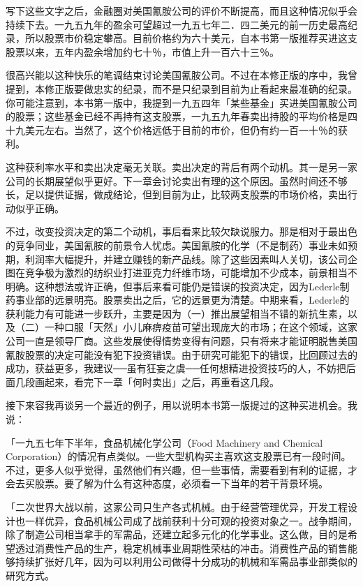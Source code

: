 \documentclass[UTF8,a4paper,zihao=-4,fontset = windows]{ctexart} %
\begin{document}
写下这些文字之后，金融圈对美国氰胺公司的评价不断提高，而且这种情况似乎会持续下去。一九五九年的盈余可望超过一九五七年二．四二美元的前一历史最高纪录，所以股票市价稳定攀高。目前价格约为六十美元，自本书第一版推荐买进这支股票以来，五年内盈余增加约七十％，市值上升一百六十三％。

很高兴能以这种快乐的笔调结束讨论美国氰胺公司。不过在本修正版的序中，我曾提到，本修正版要做忠实的纪录，而不是只纪录到目前为止看起来最准确的纪录。你可能注意到，本书第一版中，我提到一九五四年「某些基金」买进美国氰胺公司的股票；这些基金已经不再持有这支股票，一九五九年春卖出持股的平均价格是四十九美元左右。当然了，这个价格远低于目前的市价，但仍有约一百一十％的获利。

这种获利率水平和卖出决定毫无关联。卖出决定的背后有两个动机。其一是另一家公司的长期展望似乎更好。下一章会讨论卖出有理的这个原因。虽然时间还不够长，足以提供证据，做成结论，但到目前为止，比较两支股票的市场价格，卖出行动似乎正确。

不过，改变投资决定的第二个动机，事后看来比较欠缺说服力。那是相对于最出色的竞争同业，美国氰胺的前景令人忧虑。美国氰胺的化学（不是制药）事业未如预期，利润率大幅提升，并建立赚钱的新产品线。除了这些因素叫人关切，该公司企图在竞争极为激烈的纺织业打进亚克力纤维市场，可能增加不少成本，前景相当不明确。这种想法或许正确，但事后来看可能仍是错误的投资决定，因为Lederle制药事业部的远景明亮。股票卖出之后，它的远景更为清楚。中期来看，Lederle的获利能力有可能进一步跃升，主要是因为（一）推出展望相当不错的新抗生素，以及（二）一种口服「天然」小儿麻痹疫苗可望出现庞大的市场；在这个领域，这家公司一直是领导厂商。这些发展使得情势变得有问题，只有将来才能证明脱售美国氰胺股票的决定可能没有犯下投资错误。由于研究可能犯下的错误，比回顾过去的成功，获益更多，我建议──虽有狂妄之虞──任何想精进投资技巧的人，不妨把后面几段画起来，看完下一章「何时卖出」之后，再重看这几段。

接下来容我再谈另一个最近的例子，用以说明本书第一版提过的这种买进机会。我说：


「一九五七年下半年，食品机械化学公司（Food Machinery and Chemical Corporation）的情况有点类似。一些大型机构买主喜欢这支股票已有一段时间。不过，更多人似乎觉得，虽然他们有兴趣，但一些事情，需要看到有利的证据，才会去买股票。要了解为什么有这种态度，必须看一下当年的若干背景环境。

「二次世界大战以前，这家公司只生产各式机械。由于经营管理优异，开发工程设计也一样优异，食品机械公司成了战前获利十分可观的投资对象之一。战争期间，除了制造公司相当拿手的军需品，还建立起多元化的化学事业。这么做，目的是希望透过消费性产品的生产，稳定机械事业周期性荣枯的冲击。消费性产品的销售能够持续扩张好几年，因为可以利用公司做得十分成功的机械和军需品事业部类似的研究方式。
\end{document}
